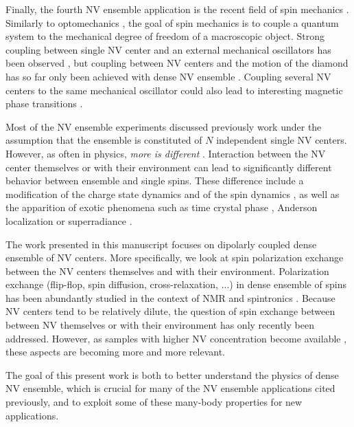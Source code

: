 \documentclass[a4paper, 11pt]{report}
\begin{document}
Finally, the fourth NV ensemble application is the recent field of spin mechanics \citep{perdriat2021spin}. Similarly to optomechanics \citep{aspelmeyer2014cavity}, the goal of spin mechanics is to couple a quantum system to the mechanical degree of freedom of a macroscopic object. Strong coupling between single NV center and an external mechanical oscillators has been observed \citep{rabl2009strong, kolkowitz2012coherent}, but coupling between NV centers and the motion of the diamond has so far only been achieved with dense NV ensemble \citep{delord2020spin, pellet2021magnetic, perdriat2022angle}. Coupling several NV centers to the same mechanical oscillator could also lead to interesting magnetic phase transitions \citep{wei2015magnetic, ma2017proposal}.
   
Most of the NV ensemble experiments discussed previously work under the assumption that the ensemble is constituted of $N$ independent single NV centers. However, as often in physics, \textit{more is different} \citep{anderson1972more}. Interaction between the NV center themselves or with their environment can lead to significantly different behavior between ensemble and single spins. These difference include a modification of the charge state dynamics \citep{giri2018coupled} and of the spin dynamics \citep{dobrovitski2008decoherence, jarmola2012temperature, mrozek2015longitudinal, choi2017depolarization}, as well as the apparition of exotic phenomena such as time crystal phase \citep{choi2017observation}, Anderson localization \citep{kucsko2018critical} or superradiance \citep{bradac2017room, angerer2018superradiant}. 

The work presented in this manuscript focuses on dipolarly coupled dense ensemble of NV centers. More specifically, we look at spin polarization exchange between the NV centers themselves and with their environment. Polarization exchange (flip-flop, spin diffusion, cross-relaxation, ...) in dense ensemble of spins has been abundantly studied in the context of NMR \citep{abragam1978principles} and spintronics \citep{vzutic2004spintronics}. Because NV centers tend to be relatively dilute, the question of spin exchange between between NV themselves \citep{choi2017depolarization} or with their environment \citep{hall2016detection} has only recently been addressed. However, as samples with higher NV concentration become available \citep{acosta2009diamonds, tallaire2020high, shenderova2019synthesis}, these aspects are becoming more and more relevant.

The goal of this present work is both to better understand the physics of dense NV ensemble, which is crucial for many of the NV ensemble applications cited previously, and to exploit some of these many-body properties for new applications.
\end{document}

